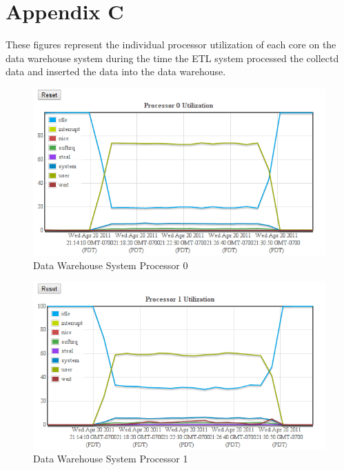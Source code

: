 \documentclass[twocolumn,letterpaper]{article}
\begin{document}
\section*{Appendix C}

These figures represent the individual processor utilization of each core on
the data warehouse system during the time the ETL system processed the collectd
data and inserted the data into the data warehouse.

\begin{figure}[ht]
  \begin{center}
    \includegraphics[scale=0.37]{etl-c6-cpu-00}
  \end{center}
  \caption{Data Warehouse System Processor 0}
  \label{etl-c6-cpu00}
\end{figure}

\begin{figure}[ht]
  \begin{center}
    \includegraphics[scale=0.37]{etl-c6-cpu-01}
  \end{center}
  \caption{Data Warehouse System Processor 1}
\end{figure}
\end{document}
